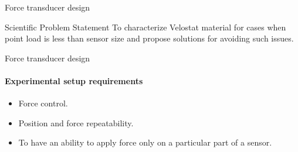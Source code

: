 \documentclass[aspectratio=169,xcolor=table]{beamer}
\begin{document}
\begin{frame}[t]{Force transducer design}
\begin{multicols}{2}
\begin{figure}[H]
                \label{fig:velostat_pressure_resistance.jpg}
            \end{figure}
    \end{multicols}
    \vspace{-12pt}
    \begin{block}{Scientific Problem Statement}
        To characterize Velostat material for cases when point load is less than sensor size and propose solutions for avoiding such issues.
    \end{block}
\end{frame}

\begin{frame}[t]{Force transducer design}
    \framesubtitle{Experimental setup requirements}
    \vspace{-0.5cm}
    {\large
        \begin{itemize}
            \item Force control. 
            \item Position and force repeatability. 
            \item To have an ability to apply force only on a particular part of a sensor. 
        \end{itemize}}
\end{frame}
\end{document}
